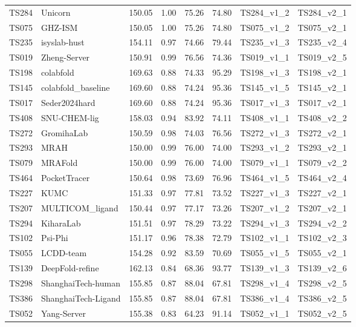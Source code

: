 \begin{longtable}{llllllll}
TS284 & Unicorn & 150.05 & 1.00 & 75.26 & 74.80 & TS284\_v1\_2 & TS284\_v2\_1 \\ 
TS075 & GHZ-ISM & 150.05 & 1.00 & 75.26 & 74.80 & TS075\_v1\_2 & TS075\_v2\_1 \\ 
TS235 & isyslab-hust & 154.11 & 0.97 & 74.66 & 79.44 & TS235\_v1\_3 & TS235\_v2\_4 \\ 
TS019 & Zheng-Server & 150.91 & 0.99 & 76.56 & 74.36 & TS019\_v1\_1 & TS019\_v2\_5 \\ 
TS198 & colabfold & 169.63 & 0.88 & 74.33 & 95.29 & TS198\_v1\_3 & TS198\_v2\_1 \\ 
TS145 & colabfold\_baseline & 169.60 & 0.88 & 74.24 & 95.36 & TS145\_v1\_5 & TS145\_v2\_1 \\ 
TS017 & Seder2024hard & 169.60 & 0.88 & 74.24 & 95.36 & TS017\_v1\_3 & TS017\_v2\_1 \\ 
TS408 & SNU-CHEM-lig & 158.03 & 0.94 & 83.92 & 74.11 & TS408\_v1\_1 & TS408\_v2\_2 \\ 
TS272 & GromihaLab & 150.59 & 0.98 & 74.03 & 76.56 & TS272\_v1\_3 & TS272\_v2\_1 \\ 
TS293 & MRAH & 150.00 & 0.99 & 76.00 & 74.00 & TS293\_v1\_2 & TS293\_v2\_1 \\ 
TS079 & MRAFold & 150.00 & 0.99 & 76.00 & 74.00 & TS079\_v1\_1 & TS079\_v2\_2 \\ 
TS464 & PocketTracer & 150.64 & 0.98 & 73.69 & 76.96 & TS464\_v1\_5 & TS464\_v2\_4 \\ 
TS227 & KUMC & 151.33 & 0.97 & 77.81 & 73.52 & TS227\_v1\_3 & TS227\_v2\_1 \\ 
TS207 & MULTICOM\_ligand & 150.44 & 0.97 & 77.17 & 73.26 & TS207\_v1\_2 & TS207\_v2\_1 \\ 
TS294 & KiharaLab & 151.51 & 0.97 & 78.29 & 73.22 & TS294\_v1\_3 & TS294\_v2\_2 \\ 
TS102 & Psi-Phi & 151.17 & 0.96 & 78.38 & 72.79 & TS102\_v1\_1 & TS102\_v2\_3 \\ 
TS055 & LCDD-team & 154.28 & 0.92 & 83.59 & 70.69 & TS055\_v1\_5 & TS055\_v2\_1 \\ 
TS139 & DeepFold-refine & 162.13 & 0.84 & 68.36 & 93.77 & TS139\_v1\_3 & TS139\_v2\_6 \\ 
TS298 & ShanghaiTech-human & 155.85 & 0.87 & 88.04 & 67.81 & TS298\_v1\_4 & TS298\_v2\_5 \\ 
TS386 & ShanghaiTech-Ligand & 155.85 & 0.87 & 88.04 & 67.81 & TS386\_v1\_4 & TS386\_v2\_5 \\ 
TS052 & Yang-Server & 155.38 & 0.83 & 64.23 & 91.14 & TS052\_v1\_1 & TS052\_v2\_5 \\ 

\end{longtable}
